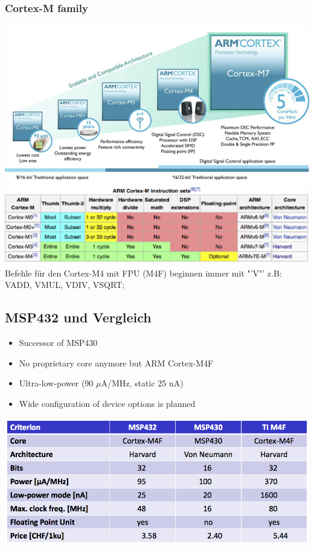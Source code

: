 \subsubsection{Cortex-M family}
\includegraphics[width = 0.8\linewidth]{images/Plattformen/Cortex_M_Family}\newline
\includegraphics[width = 0.8\linewidth]{images/Plattformen/Cortex_M_instr_set}\newline
Befehle für den Cortex-M4 mit FPU (M4F) beginnen immer mit "'V"' z.B: VADD, VMUL, VDIV, VSQRT;\newline
\newline
\begin{minipage}{0.4\textwidth}
\subsection{MSP432 und Vergleich}
\begin{itemize}
  \item Successor of MSP430
  \vspace{-0.7\baselineskip}
  \item No proprietary core anymore but ARM Cortex-M4F
  \vspace{-0.7\baselineskip}
  \item Ultra-low-power (90 $\mu$A/MHz, static 25 nA)
  \vspace{-0.7\baselineskip}
  \item Wide configuration of device options is planned
\end{itemize}
\end{minipage}
\begin{minipage}{0.6\textwidth}
\includegraphics[width = 1\linewidth]{images/Plattformen/Comparison}
\end{minipage}
